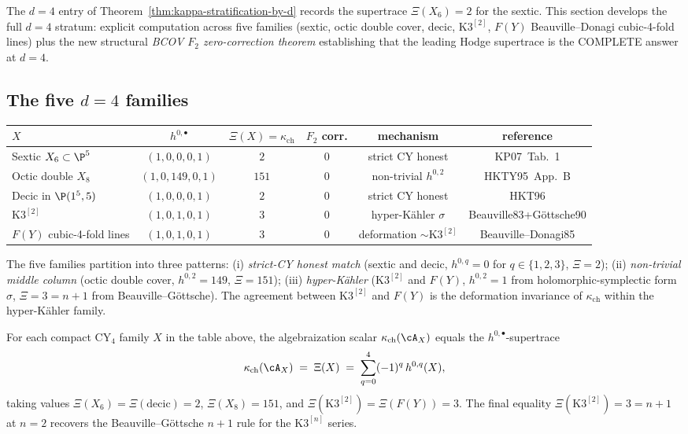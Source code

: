 The $d = 4$ entry of Theorem~\ref{thm:kappa-stratification-by-d}
records the supertrace $\Xi(X_6) = 2$ for the sextic. This section
develops the full $d = 4$ stratum: explicit computation across five
families (sextic, octic double cover, decic, $\mathrm{K3}^{[2]}$,
$F(Y)$ Beauville--Donagi cubic-4-fold lines) plus the new structural
\emph{BCOV $F_2$ zero-correction theorem} establishing that the leading
Hodge supertrace is the COMPLETE answer at $d = 4$.

\subsection{The five \texorpdfstring{$d = 4$}{d = 4} families}
\label{subsec:cy-strat-d4-families}

\begin{center}
\begin{tabular}{lccccc}
\toprule
$X$ & $h^{0,\bullet}$ & $\Xi(X) = \kappa_{\mathrm{ch}}$ & $F_2$ corr. &
mechanism & reference \\
\midrule
Sextic $X_6 \subset \P^5$ & $(1,0,0,0,1)$ & $2$ & $0$ & strict CY honest &
KP07~Tab.~1 \\
Octic double $X_8$ & $(1,0,149,0,1)$ & $151$ & $0$ & non-trivial $h^{0,2}$ &
HKTY95~App.~B \\
Decic in $\P(1^5,5)$ & $(1,0,0,0,1)$ & $2$ & $0$ & strict CY honest &
HKT96 \\
$\mathrm{K3}^{[2]}$ & $(1,0,1,0,1)$ & $3$ & $0$ & hyper-K\"ahler $\sigma$ &
Beauville83+G\"ottsche90 \\
$F(Y)$ cubic-4-fold lines & $(1,0,1,0,1)$ & $3$ & $0$ & deformation
$\sim \mathrm{K3}^{[2]}$ & Beauville--Donagi85 \\
\bottomrule
\end{tabular}
\end{center}

The five families partition into three patterns: (i) \emph{strict-CY
honest match} (sextic and decic, $h^{0,q} = 0$ for $q \in \{1,2,3\}$,
$\Xi = 2$); (ii) \emph{non-trivial middle column} (octic double cover,
$h^{0,2} = 149$, $\Xi = 151$); (iii) \emph{hyper-K\"ahler} ($\mathrm{K3}^{[2]}$
and $F(Y)$, $h^{0,2} = 1$ from holomorphic-symplectic form $\sigma$,
$\Xi = 3 = n + 1$ from Beauville--G\"ottsche). The agreement between
$\mathrm{K3}^{[2]}$ and $F(Y)$ is the deformation invariance of
$\kappa_{\mathrm{ch}}$ within the hyper-K\"ahler family.

\begin{theorem}[\texorpdfstring{$d=4$}{d=4} stratification of \texorpdfstring{$\kappa_{\mathrm{ch}}$}{kappa-ch}]
\label{thm:cy-d-d4-stratification}
For each compact CY$_4$ family $X$ in the table above, the
algebraization scalar $\kappa_{\mathrm{ch}}(\cA_X)$ equals the
$h^{0,\bullet}$-supertrace
\[
 \kappa_{\mathrm{ch}}(\cA_X) \;=\; \Xi(X) \;=\; \sum_{q=0}^{4} (-1)^q\, h^{0,q}(X),
\]
taking values $\Xi(X_6) = \Xi(\text{decic}) = 2$,
$\Xi(X_8) = 151$, and $\Xi(\mathrm{K3}^{[2]}) = \Xi(F(Y)) = 3$. The
final equality $\Xi(\mathrm{K3}^{[2]}) = 3 = n + 1$ at $n = 2$
recovers the Beauville--G\"ottsche $n + 1$ rule for the
$\mathrm{K3}^{[n]}$ series.
\end{theorem}

